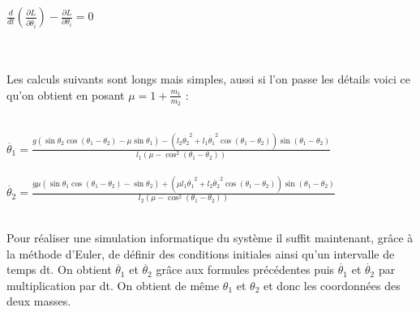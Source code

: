 \documentclass{article}
\begin{document}
\begin{Large}
$\frac{d}{dt}(\frac{\partial L}{\partial \dot{\theta_{i}}})-\frac{\partial L}{\partial \theta_{i}}=0$
\end{Large}
\\
\\
Les calculs suivants sont longs mais simples, aussi si l'on passe les détails voici ce qu'on obtient en posant $\mu=1+\frac{m_{1}}{m_{2}}$ :
\\
\\
\begin{Large}
$\ddot{\theta_1} =\frac{g\left(\sin \theta_2 \cos (\theta_1-\theta_2)- \mu\sin \theta_1\right)-\left(l_2\dot{\theta_2}^2+l_1\dot{\theta_1}^2\cos (\theta_1-\theta_2)\right)\sin (\theta_1-\theta_2)}{l_1\left(\mu-\cos^2 (\theta_1-\theta_2)\right)}$\\
\\
$\ddot{\theta_2} = \frac{g\mu(\sin \theta_1\cos (\theta_1 - \theta_2) - \sin \theta_2)+\left(\mu l_1\dot{\theta_1}^2+l_2\dot{\theta_2}^2\cos(\theta_1-\theta_2)\right)\sin(\theta_1-\theta_2)}{l_2\left(\mu-\cos^2 (\theta_1-\theta_2)\right)}$\\
\\
\end{Large}
Pour réaliser une simulation informatique du système il suffit maintenant, grâce à la méthode d'Euler, de définir des conditions initiales ainsi qu'un intervalle de temps dt. On obtient $\ddot{\theta_{1}}$ et $\ddot{\theta_{2}}$ grâce aux formules précédentes puis $\dot{\theta_{1}}$ et $\dot{\theta_{2}}$ par multiplication par dt. On obtient de même $\theta_{1}$ et $\theta_{2}$ et donc les coordonnées des deux masses.
\end{document}
